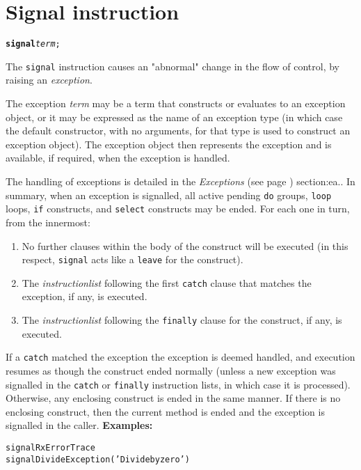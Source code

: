 \chapter{Signal instruction}\label{"id"}
\index{,}
\index{,}
\begin{shaded}
\begin{alltt}
\textbf{signal} \emph{term};
\end{alltt}
\end{shaded}
 The \texttt{signal} instruction causes an "abnormal" change
in the flow of control, by raising an \emph{exception}.
 
The exception \emph{term} may be a term that constructs or evaluates
to an exception object, or it may be expressed as the name of an
exception type (in which case the default constructor, with no
arguments, for that type is used to construct an exception object).
The exception object then represents the exception and is available, if
required, when the exception is handled.
 
The handling of exceptions is detailed in the
 \emph{Exceptions} (see page \pageref{refexcep}) 
section:ea..
In summary, when an exception is signalled, all active pending
\texttt{do} groups, \texttt{loop} loops, \texttt{if} constructs, and
\texttt{select} constructs may be ended.
For each one in turn, from the innermost:
\begin{enumerate}
\item No further clauses within the body of the construct will be executed
(in this respect, \texttt{signal} acts like a \texttt{leave} for the
construct).
\item The \emph{instructionlist} following the first \texttt{catch}
clause that matches the exception, if any, is executed.
\item The \emph{instructionlist} following the \texttt{finally}
clause for the construct, if any, is executed.
\end{enumerate}
If a \texttt{catch} matched the exception the exception is deemed
handled, and execution resumes as though the construct ended normally
(unless a new exception was signalled in the \texttt{catch} or
\texttt{finally} instruction lists, in which case it is processed).
Otherwise, any enclosing construct is ended in the same manner.
If there is no enclosing construct, then the current method is ended and
the exception is signalled in the caller.
 \textbf{Examples:}
\begin{alltt}
signal RxErrorTrace
signal DivideException('Divide by zero')
\end{alltt}

